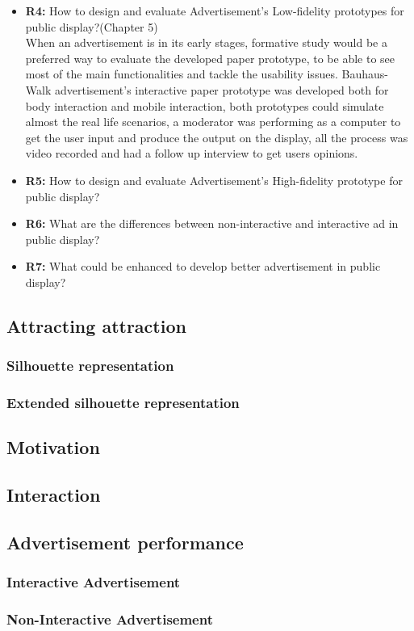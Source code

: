 \begin{itemize}
\item \textbf{R4: }How to design and evaluate Advertisement's Low-fidelity prototypes for public display?(Chapter 5) \\
When an advertisement is in its early stages, formative study would be a preferred way to evaluate the developed paper prototype, to be able to see most of the main functionalities and tackle the usability issues. Bauhaus-Walk advertisement’s interactive paper prototype was developed both for body interaction and mobile interaction, both prototypes could simulate almost the real life scenarios, a moderator was performing as a computer to get the user input and produce the output on the display, all the process was video recorded and had a follow up interview to get users opinions. 


\item \textbf{R5: }How to design and evaluate Advertisement's High-fidelity prototype for public display?
\item \textbf{R6: }What are the differences between non-interactive and interactive ad in public display?
\item \textbf{R7: }What could be enhanced to develop better advertisement in public display? 

\end{itemize}
\fi

\subsection{Attracting attraction}
\subsubsection{Silhouette representation}
\subsubsection{Extended silhouette representation}

\subsection{Motivation}

\subsection{Interaction}

\subsection{Advertisement performance}
\subsubsection{Interactive Advertisement}
\subsubsection{Non-Interactive Advertisement}



\section{}


